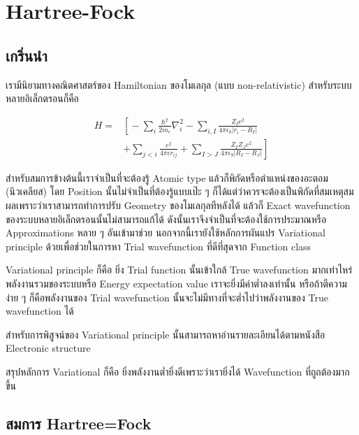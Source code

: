 
\chapter{Hartree-Fock}

\section{เกริ่นนำ}

เรามีนิยามทางคณิตศาสตร์ของ Hamiltonian ของโมเลกุล (แบบ non-relativistic) สำหรับระบบหลายอิเล็กตรอนก็คือ

\begin{equation}
\begin{aligned}
    H = &
    \left[ \right. 
        -\sum_{i} \frac{\hbar^{2}}{2m_{e}} \nabla^{2}_{i}
        -\sum_{i,I} \frac{Z_{I} e^{2}}{4\pi\epsilon_{0} |r_{i} - R_{I}|} \\
        & +\sum_{j<i} \frac{e^{2}}{4\pi\epsilon r_{ij}}
        +\sum_{I>J} \frac{Z_{I} Z_{J} e^{2}}{4\pi\epsilon_{9} |R_{I} - R_{J}|} 
    \left. \right]
\end{aligned}
\end{equation}

สำหรับสมการข้างต้นนี้เราจำเป็นที่จะต้องรู้ Atomic type แล้วก็พิกัดหรือตำแหน่งของอะตอม (นิวเคลียส) 
โดย Position นั้นไม่จำเป็นที่ต้องรู้แบบเป๊ะ ๆ ก็ได้แต่ว่าควรจะต้องเป็นพิกัดที่สมเหตุสมผลเพราะว่าเราสามารถทำการปรับ 
Geometry ของโมเลกุลทีหลังได้ แล้วก็ Exact wavefunction ของระบบหลายอิเล็กตรอนนั้นไม่สามารถแก้ได้ 
ดังนั้นเราจึงจำเป็นที่จะต้องใช้การประมาณหรือ Approximations หลาย ๆ อันเข้ามาช่วย นอกจากนี้เรายังใช้หลักการผันแปร 
Variational principle ด้วยเพื่อช่วยในการหา Trial wavefunction ที่ดีที่สุดจาก Function class

Variational principle ก็คือ ยิ่ง Trial function นั้นเข้าใกล้ True wavefunction มากเท่าไหร่ 
พลังงานรวมของระบบหรือ Energy expectation value เราจะยิ่งมีค่าต่ำลงเท่านั้น หรือถ้าตีความง่าย ๆ 
ก็คือพลังงานของ Trial wavefunction นั้นจะไม่มีทางที่จะต่ำไปว่าพลังงานของ True wavefunction ได้ 

สำหรับการพิสูจน์ของ Variational principle นั้นสามารถหาอ่านรายละเอียนได้ตามหนังสือ Electronic 
structure 

สรุปหลักการ Variational ก็คือ ยิ่งพลังงานต่ำยิ่งดีเพราะว่าเรายิ่งได้ Wavefunction ที่ถูถต้องมากขึ้น 

\section{สมการ Hartree=Fock}

